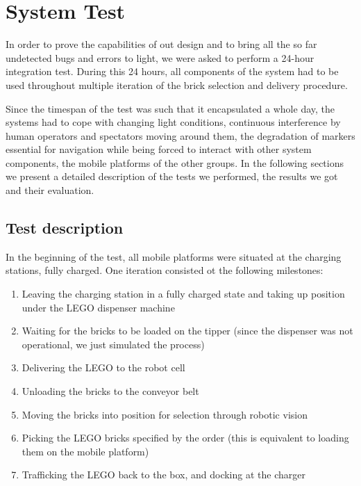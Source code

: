 \chapter{System Test}\label{chap:system_test_chapter}


In order to prove the capabilities of out design and to bring all the so far undetected bugs and errors to light, we were asked to perform a 24-hour integration test. During this 24 hours, all components of the system had to be used throughout multiple iteration of the brick selection and delivery procedure. 

Since the timespan of the test was such that it encapsulated a whole day, the systems had to cope with changing light conditions, continuous interference by human operators and spectators moving around them, the degradation of markers essential for navigation while being forced to interact with other system components, the mobile platforms of the other groups. In the following sections we present a detailed description of the tests we performed, the results we got and their evaluation.


\section{Test description}

In the beginning of the test, all mobile platforms were situated at the charging stations, fully charged. One iteration consisted ot the following milestones:

\begin{enumerate}
	\item Leaving the charging station in a fully charged state and taking up position under the LEGO dispenser machine
	\item Waiting for the bricks to be loaded on the tipper (since the dispenser was not operational, we just simulated the process)
	\item Delivering the LEGO to the robot cell
	\item Unloading the bricks to the conveyor belt
	\item Moving the bricks into position for selection through robotic vision
	\item Picking the LEGO bricks specified by the order (this is equivalent to loading them on the mobile platform)
	\item Trafficking the LEGO back to the box, and docking at the charger
\end{enumerate}

